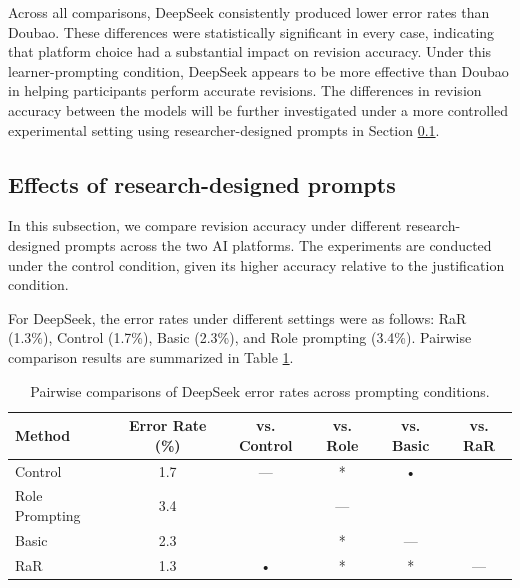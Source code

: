 \documentclass[english]{textolivre}
\begin{document}
Across all comparisons, DeepSeek consistently produced lower error rates than Doubao. These differences were statistically significant in every case, indicating that platform choice had a substantial impact on revision accuracy. Under this learner-prompting condition, DeepSeek appears to be more effective than Doubao in helping participants perform accurate revisions. The differences in revision accuracy between the models will be further investigated under a more controlled experimental setting using researcher-designed prompts in Section \ref{4.3}.

\subsection{Effects of research-designed prompts}\label{4.3}

In this subsection, we compare revision accuracy under different research-designed prompts across the two AI platforms. The experiments are conducted under the control condition, given its higher accuracy relative to the justification condition.

For DeepSeek, the error rates under different settings were as follows: RaR (1.3\%), Control (1.7\%), Basic (2.3\%), and Role prompting (3.4\%). Pairwise comparison results are summarized in Table \ref{tab1}.

\begin{table}[htpb]
\centering
\begin{threeparttable}
\caption{Pairwise comparisons of DeepSeek error rates across prompting conditions.}
\label{tab1}
\begin{tabular}{lccccc} 
\hline
Method         & Error Rate (\%) & vs. Control & vs. Role & vs. Basic & vs. RaR  \\ 
\hline
Control        & 1.7             & —           & *        & •         &         \\
Role Prompting & 3.4             &            & —        &          &         \\
Basic          & 2.3             &            & *        & —         &         \\
RaR            & 1.3             & •           & *        & *         & —        \\
\hline
\end{tabular}
\end{threeparttable}
\end{table}
\end{document}
